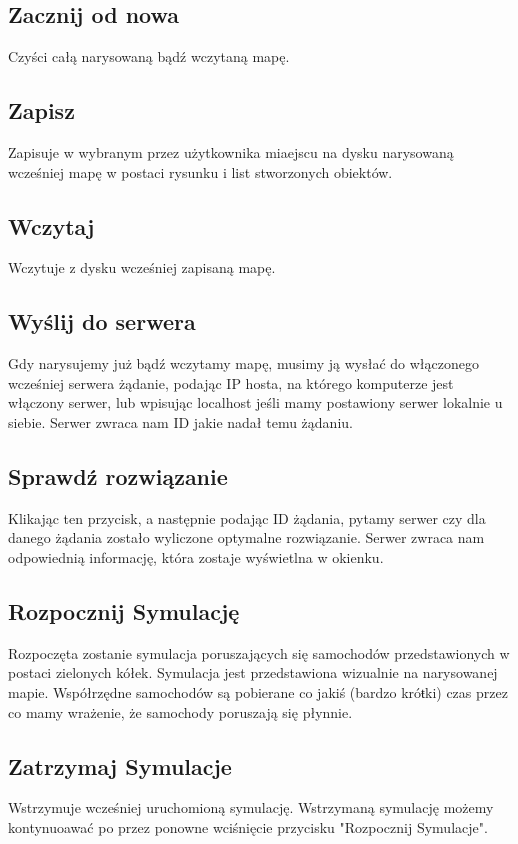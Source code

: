 \documentclass{article}
\begin{document}
\subsection{Zacznij od nowa}
    Czyści całą narysowaną bądź wczytaną mapę.

\subsection{Zapisz}
    Zapisuje w wybranym przez użytkownika miaejscu na dysku narysowaną wcześniej mapę w postaci rysunku i list stworzonych obiektów.

\subsection{Wczytaj}
    Wczytuje z dysku wcześniej zapisaną mapę.

\subsection{Wyślij do serwera}
    Gdy narysujemy już bądź wczytamy mapę, musimy ją wysłać do włączonego wcześniej serwera żądanie, podając IP hosta, na którego komputerze jest włączony serwer, lub wpisując localhost jeśli mamy postawiony serwer lokalnie u siebie. Serwer zwraca nam ID jakie nadał temu żądaniu.

\subsection{Sprawdź rozwiązanie}
    Klikając ten przycisk, a następnie podając ID żądania, pytamy serwer czy dla danego żądania zostało wyliczone optymalne rozwiązanie. Serwer zwraca nam odpowiednią informację, która zostaje wyświetlna w okienku.

\subsection{Rozpocznij Symulację}
    Rozpoczęta zostanie symulacja poruszających się samochodów przedstawionych w postaci zielonych kółek. Symulacja jest przedstawiona wizualnie na narysowanej mapie. Współrzędne samochodów są pobierane co jakiś (bardzo króŧki) czas przez co mamy wrażenie, że samochody poruszają się płynnie.

\subsection{Zatrzymaj Symulacje}
    Wstrzymuje wcześniej uruchomioną symulację. Wstrzymaną symulację możemy kontynuoawać po przez ponowne wciśnięcie przycisku "Rozpocznij Symulacje".
\end{document}
